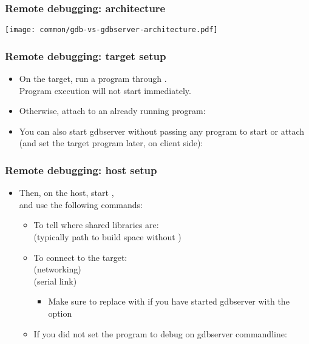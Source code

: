 \begin{frame}
  \frametitle{Remote debugging: architecture}
  \begin{center}
    \texttt{[image: common/gdb-vs-gdbserver-architecture.pdf]}
  \end{center}
\end{frame}

\begin{frame}
  \frametitle{Remote debugging: target setup}
  \begin{itemize}
  \item On the target, run a program through .\\
    Program execution will not start immediately.\\
  \item Otherwise, attach  to an already running program:\\
  \item You can also start gdbserver without passing any program to start or
  attach (and set the target program later, on client side):\\
  \end{itemize}
\end{frame}

\begin{frame}
  \frametitle{Remote debugging: host setup}
  \begin{itemize}
  \item Then, on the host, start ,\\
    and use the following  commands:
    \begin{itemize}
    \item To tell  where shared libraries are:\\
       (typically path to build space without )
    \item To connect to the target:\\
       (networking)\\
       (serial link)\\
      \begin{itemize}
        \item Make sure to replace  with  if you have started gdbserver with the 
      option
      \end{itemize}
    \item If you did not set the program to debug on gdbserver commandline:\\
    \end{itemize}
  \end{itemize}
\end{frame}

